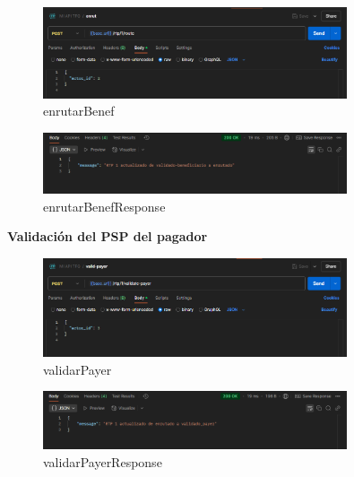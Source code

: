     \begin{figure}[H]
    \centering
    \includegraphics[width=0.8\textwidth]{Imagenes/enrutarBenef.png}
    \caption{enrutarBenef}
    \label{fig:enrutarBenef}
    \end{figure}


    \begin{figure}[H]
    \centering
    \includegraphics[width=0.8\textwidth]{Imagenes/enrutarBenefResponse.png}
    \caption{enrutarBenefResponse}
    \label{fig:enrutarBenefResponse}
    \end{figure}

\item \textbf{Validación del PSP del pagador}

    \begin{figure}[H]
    \centering
    \includegraphics[width=0.8\textwidth]{Imagenes/validarPayer.png}
    \caption{validarPayer}
    \label{fig:validarPayer}
    \end{figure}

    \begin{figure}[H]
    \centering
    \includegraphics[width=0.8\textwidth]{Imagenes/validarPayerResponse.png}
    \caption{validarPayerResponse}
    \label{fig:validarPayerResponse}
    \end{figure}

